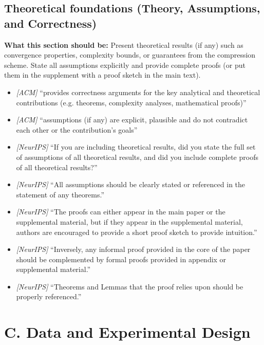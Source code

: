 \documentclass[11pt]{article}
\begin{document}
\subsection{Theoretical foundations (Theory, Assumptions, and Correctness)}
\noindent\textbf{What this section should be:}
Present theoretical results (if any) such as convergence properties, complexity bounds, or guarantees from the compression scheme. State all assumptions explicitly and provide complete proofs (or put them in the supplement with a proof sketch in the main text).
\begin{itemize}
  \item \textit{[ACM]} ``provides correctness arguments for the key analytical and theoretical contributions (e.g. theorems, complexity analyses, mathematical proofs)''
  \item \textit{[ACM]} ``assumptions (if any) are explicit, plausible and do not contradict each other or the contribution's goals''
  \item \textit{[NeurIPS]} ``If you are including theoretical results, did you state the full set of assumptions of all theoretical results, and did you include complete proofs of all theoretical results?''
  \item \textit{[NeurIPS]} ``All assumptions should be clearly stated or referenced in the statement of any theorems.''
  \item \textit{[NeurIPS]} ``The proofs can either appear in the main paper or the supplemental material, but if they appear in the supplemental material, authors are encouraged to provide a short proof sketch to provide intuition.''
  \item \textit{[NeurIPS]} ``Inversely, any informal proof provided in the core of the paper should be complemented by formal proofs provided in appendix or supplemental material.''
  \item \textit{[NeurIPS]} ``Theorems and Lemmas that the proof relies upon should be properly referenced.''
\end{itemize}

\section*{C. Data and Experimental Design}
\end{document}
